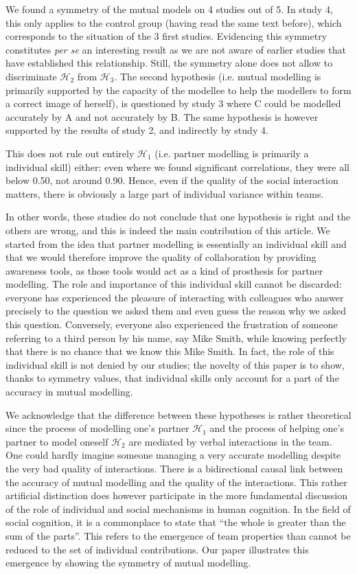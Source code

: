 \documentclass[natbib]{svjour3}
\newcommand{\ie}{i.e.\xspace}
\newcommand{\A}{A\xspace}
\newcommand{\B}{B\xspace}
\newcommand{\C}{C\xspace}
\begin{document}
We found a symmetry of the mutual models on 4 studies out of 5. In study 4, this
only applies to the control group (having read the same text before), which
corresponds to the situation of the 3 first studies. Evidencing this symmetry
constitutes \textit{per se} an interesting result as we are not aware of earlier
studies that have established this relationship.
Still, the symmetry alone does not allow to discriminate $\mathcal{H}_{2}$ from
$\mathcal{H}_{3}$. The second hypothesis (\ie mutual modelling is primarily
supported by the capacity of the modellee to help the modellers to form a
correct image of herself), is questioned by study 3 where \C could be modelled
accurately by \A and not accurately by \B. The same hypothesis is however
supported by the results of study 2, and indirectly by study 4.

This does not rule out entirely $\mathcal{H}_{1}$ (\ie partner modelling is
primarily a individual skill) either: even where we found significant
correlations, they were all below 0.50, not around 0.90.  Hence, even if the
quality of the social interaction matters, there is obviously a large part of
individual variance within teams.

In other words, these studies do not conclude that one hypothesis is right and the
others are wrong, and this is indeed the main contribution of this article. We
started from the idea that partner modelling is essentially an individual skill
and that we would therefore improve the quality of collaboration by providing 
awareness tools, as those tools would act as a kind of prosthesis for partner
modelling. The role and importance of this individual skill cannot be discarded:
everyone has experienced the pleasure of interacting with colleagues who answer precisely to the question
we asked them and even guess the reason why we asked this question. Conversely,
everyone also experienced the frustration of someone referring to a third
person by his name, say Mike Smith, while knowing perfectly that there is no
chance that we know this Mike Smith. In fact, the role of this individual skill is
not denied by our studies; the novelty of this paper is to show, thanks to
symmetry values, that individual skills only account for a part of the accuracy
in mutual modelling.

We acknowledge that the difference between these hypotheses is rather
theoretical since the  process of modelling one's partner $\mathcal{H}_{1}$ and
the process of helping one's partner to model oneself $\mathcal{H}_{2}$ are
mediated by verbal interactions in the team. One could hardly imagine someone
managing a very accurate modelling despite the very bad quality of interactions.
There is a bidirectional causal link between the accuracy of mutual modelling
and the quality of the interactions. This rather artificial distinction does
however participate in the more fundamental discussion of the role of individual
and social mechanisms in human cognition. In the field of social cognition, it
is a commonplace to state that ``the whole is greater than the sum of the
parts''.  This refers to the emergence of team properties than cannot be reduced
to the set of individual contributions. Our paper illustrates this emergence by
showing the symmetry of mutual modelling.
\end{document}
